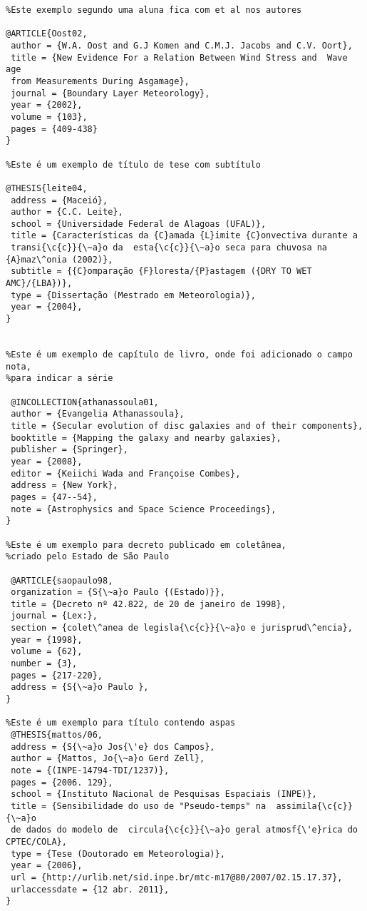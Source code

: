 \begin{verbatim}
%Este exemplo segundo uma aluna fica com et al nos autores 

@ARTICLE{Oost02, 
 author = {W.A. Oost and G.J Komen and C.M.J. Jacobs and C.V. Oort},
 title = {New Evidence For a Relation Between Wind Stress and  Wave age 
 from Measurements During Asgamage},
 journal = {Boundary Layer Meteorology},
 year = {2002},
 volume = {103},
 pages = {409-438}
}

%Este é um exemplo de título de tese com subtítulo

@THESIS{leite04,
 address = {Maceió},
 author = {C.C. Leite},
 school = {Universidade Federal de Alagoas (UFAL)},
 title = {Características da {C}amada {L}imite {C}onvectiva durante a 
 transi{\c{c}}{\~a}o da  esta{\c{c}}{\~a}o seca para chuvosa na {A}maz\^onia (2002)},
 subtitle = {{C}omparação {F}loresta/{P}astagem ({DRY TO WET AMC}/{LBA})},
 type = {Dissertação (Mestrado em Meteorologia)},
 year = {2004},
}


%Este é um exemplo de capítulo de livro, onde foi adicionado o campo nota, 
%para indicar a série 

 @INCOLLECTION{athanassoula01,
 author = {Evangelia Athanassoula},
 title = {Secular evolution of disc galaxies and of their components},
 booktitle = {Mapping the galaxy and nearby galaxies},
 publisher = {Springer},
 year = {2008},
 editor = {Keiichi Wada and Françoise Combes},
 address = {New York},
 pages = {47--54},
 note = {Astrophysics and Space Science Proceedings},
}

%Este é um exemplo para decreto publicado em coletânea, 
%criado pelo Estado de São Paulo

 @ARTICLE{saopaulo98,
 organization = {S{\~a}o Paulo {(Estado)}},  
 title = {Decreto nº 42.822, de 20 de janeiro de 1998},
 journal = {Lex:},	
 section = {colet\^anea de legisla{\c{c}}{\~a}o e jurisprud\^encia},
 year = {1998},
 volume = {62},
 number = {3},
 pages = {217-220},
 address = {S{\~a}o Paulo },
}

%Este é um exemplo para título contendo aspas 
 @THESIS{mattos/06,
 address = {S{\~a}o Jos{\'e} dos Campos},
 author = {Mattos, Jo{\~a}o Gerd Zell},
 note = {(INPE-14794-TDI/1237)},
 pages = {2006. 129},
 school = {Instituto Nacional de Pesquisas Espaciais (INPE)},
 title = {Sensibilidade do uso de "Pseudo-temps" na  assimila{\c{c}}{\~a}o 
 de dados do modelo de  circula{\c{c}}{\~a}o geral atmosf{\'e}rica do CPTEC/COLA},
 type = {Tese (Doutorado em Meteorologia)},
 year = {2006},              
 url = {http://urlib.net/sid.inpe.br/mtc-m17@80/2007/02.15.17.37},
 urlaccessdate = {12 abr. 2011},
}
 

\end{verbatim}
